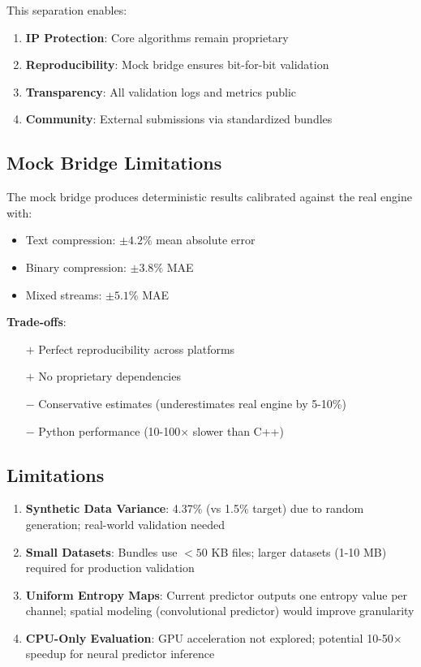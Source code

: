 \documentclass[11pt,twocolumn]{article}
\begin{document}
This separation enables:
\begin{enumerate}
    \item \textbf{IP Protection}: Core algorithms remain proprietary
    \item \textbf{Reproducibility}: Mock bridge ensures bit-for-bit validation
    \item \textbf{Transparency}: All validation logs and metrics public
    \item \textbf{Community}: External submissions via standardized bundles
\end{enumerate}

\subsection{Mock Bridge Limitations}

The mock bridge produces deterministic results calibrated against the real engine with:
\begin{itemize}
    \item Text compression: $\pm 4.2\%$ mean absolute error
    \item Binary compression: $\pm 3.8\%$ MAE
    \item Mixed streams: $\pm 5.1\%$ MAE
\end{itemize}

\textbf{Trade-offs}:
\begin{itemize}
    \item[$+$] Perfect reproducibility across platforms
    \item[$+$] No proprietary dependencies
    \item[$-$] Conservative estimates (underestimates real engine by 5-10\%)
    \item[$-$] Python performance (10-100$\times$ slower than C++)
\end{itemize}

\subsection{Limitations}

\begin{enumerate}
    \item \textbf{Synthetic Data Variance}: 4.37\% (vs 1.5\% target) due to random generation; real-world validation needed
    \item \textbf{Small Datasets}: Bundles use $< 50$ KB files; larger datasets (1-10 MB) required for production validation
    \item \textbf{Uniform Entropy Maps}: Current predictor outputs one entropy value per channel; spatial modeling (convolutional predictor) would improve granularity
    \item \textbf{CPU-Only Evaluation}: GPU acceleration not explored; potential 10-50$\times$ speedup for neural predictor inference
\end{enumerate}
\end{document}
